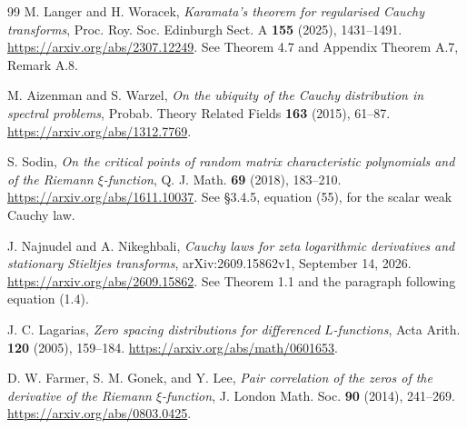 \begin{thebibliography}{99}
M. Langer and H. Woracek, \emph{Karamata's theorem for regularised Cauchy
transforms}, Proc. Roy. Soc. Edinburgh Sect. A \textbf{155} (2025), 1431--1491.
\url{https://arxiv.org/abs/2307.12249}.
See Theorem 4.7 and Appendix Theorem A.7, Remark A.8.

M. Aizenman and S. Warzel, \emph{On the ubiquity of the Cauchy distribution
in spectral problems}, Probab. Theory Related Fields \textbf{163} (2015), 61--87.
\url{https://arxiv.org/abs/1312.7769}.

S. Sodin, \emph{On the critical points of random matrix characteristic
polynomials and of the Riemann $\xi$-function}, Q. J. Math. \textbf{69}
(2018), 183--210. \url{https://arxiv.org/abs/1611.10037}.
See \S3.4.5, equation (55), for the scalar weak Cauchy law.

J. Najnudel and A. Nikeghbali, \emph{Cauchy laws for zeta logarithmic
derivatives and stationary Stieltjes transforms}, arXiv:2609.15862v1,
September 14, 2026. \url{https://arxiv.org/abs/2609.15862}.
See Theorem 1.1 and the paragraph following equation (1.4).

J. C. Lagarias, \emph{Zero spacing distributions for differenced $L$-functions},
Acta Arith. \textbf{120} (2005), 159--184.
\url{https://arxiv.org/abs/math/0601653}.

D. W. Farmer, S. M. Gonek, and Y. Lee, \emph{Pair correlation of the zeros
of the derivative of the Riemann $\xi$-function}, J. London Math. Soc.
\textbf{90} (2014), 241--269.
\url{https://arxiv.org/abs/0803.0425}.
\end{thebibliography}
